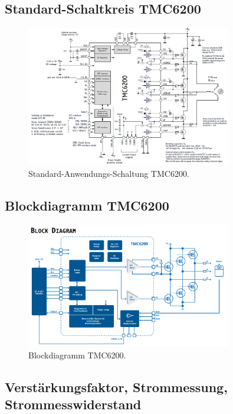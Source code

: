\begin{appendix}
\subsection{Standard-Schaltkreis TMC6200}

\begin{figure}[h!]
	\centering
	\includegraphics[width=0.8\textwidth]{graphics/Standard_Application_Cirquit_TMC6200.png}
	\caption{Standard-Anwendungs-Schaltung TMC6200.}
	\label{fig:Schaltung_TMC6200}
\end{figure}

\subsection{Blockdiagramm TMC6200}

\begin{figure}[h!]
	\centering
	\includegraphics[width=0.8\textwidth]{graphics/Blockdiagramm_TMC6200.png}
	\caption{Blockdiagramm TMC6200.}
	\label{fig:Blockdiagramm_TMC6200}
\end{figure}

\newpage

\subsection{Verstärkungsfaktor, Strommessung, Strommesswiderstand}


\end{appendix}
